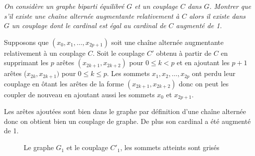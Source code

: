 \begin{Exercise}\it
On considère un graphe biparti équilibré $G$ et un couplage $C$ dans $G$. Montrer que s'il existe une chaîne alternée augmentante relativement à $C$ alors il existe dans $G$ un couplage dont le cardinal est égal au cardinal de $C$ augmenté de 1.
\end{Exercise}
\begin{Answer}
Supposons que $(x_0 , x_1 , \ldots, x_{2p+1} )$ soit une chaîne alternée augmentante relativement à un couplage $C$.
Soit le couplage $C'$ obtenu à partir de $C$ en supprimant les $p$ arêtes $(x_{2k+1} , x_{2k+2} )$ pour $0 \le k < p$ et en ajoutant les $p+1$ arêtes ($x_{2k} , x_{2k+1} )$ pour $0 \le k \le p$. Les sommets $x_1, x_2, \ldots, x_{2p}$ ont perdu leur couplage en ôtant les arêtes de la forme $(x_{2k+1} , x_{2k+2} )$ donc on peut les coupler de nouveau en ajoutant aussi les sommets $x_0$ et $x_{2p+1}$.

Les arêtes ajoutées sont bien dans le graphe par définition d'une chaîne alternée donc on obtient bien  un couplage de graphe.
De plus son cardinal a été augmenté de 1.
\end{Answer}
\begin{figure}[h]
\centering
{}
\caption{Le graphe $G_1$ et le couplage $C'_1$, les sommets atteints sont grisés}
\end{figure}
